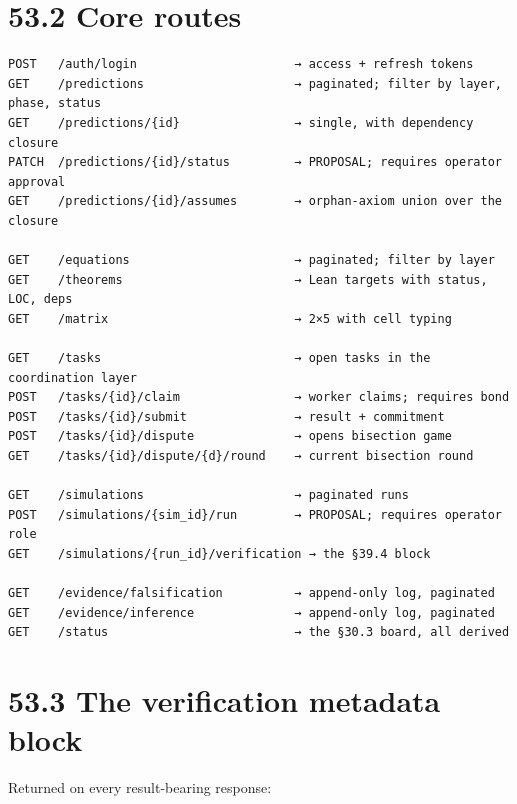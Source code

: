 \documentclass[
  11pt]{report}
\begin{document}
\hypertarget{core-routes}{%
\section{53.2 Core routes}\label{core-routes}}

\begin{verbatim}
POST   /auth/login                      → access + refresh tokens
GET    /predictions                     → paginated; filter by layer, phase, status
GET    /predictions/{id}                → single, with dependency closure
PATCH  /predictions/{id}/status         → PROPOSAL; requires operator approval
GET    /predictions/{id}/assumes        → orphan-axiom union over the closure

GET    /equations                       → paginated; filter by layer
GET    /theorems                        → Lean targets with status, LOC, deps
GET    /matrix                          → 2×5 with cell typing

GET    /tasks                           → open tasks in the coordination layer
POST   /tasks/{id}/claim                → worker claims; requires bond
POST   /tasks/{id}/submit               → result + commitment
POST   /tasks/{id}/dispute              → opens bisection game
GET    /tasks/{id}/dispute/{d}/round    → current bisection round

GET    /simulations                     → paginated runs
POST   /simulations/{sim_id}/run        → PROPOSAL; requires operator role
GET    /simulations/{run_id}/verification → the §39.4 block

GET    /evidence/falsification          → append-only log, paginated
GET    /evidence/inference              → append-only log, paginated
GET    /status                          → the §30.3 board, all derived
\end{verbatim}

\hypertarget{the-verification-metadata-block}{%
\section{53.3 The verification metadata
block}\label{the-verification-metadata-block}}

Returned on every result-bearing response:
\end{document}
